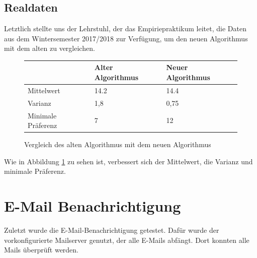 		\subsection{Realdaten}
		
			Letztlich stellte uns der Lehrstuhl, der das Empiriepraktikum leitet, die Daten aus dem Wintersemester 2017/2018 zur Verfügung, um den neuen Algorithmus mit dem alten zu vergleichen.\newline
			
			\begin{figure}
				\centering
				\begin{tabular}{l|l|l}
					& Alter Algorithmus & Neuer Algorithmus \\
					\hline
					Mittelwert & 14.2 & 14.4 \\
					Varianz & 1,8 & 0,75 \\
					Minimale Präferenz & 7 & 12 \\
				\end{tabular}
				\caption{Vergleich des alten Algorithmus mit dem neuen Algorithmus}
				\label{tab:old_versus_new_algorithm}
			\end{figure}
		
			Wie in Abbildung \ref{tab:old_versus_new_algorithm} zu sehen ist, verbessert sich der Mittelwert, die Varianz und minimale Präferenz.
		
	\section{E-Mail Benachrichtigung}
		Zuletzt wurde die E-Mail-Benachrichtigung getestet.
		Dafür wurde der vorkonfigurierte Mailserver genutzt, der alle E-Mails abfängt.
		Dort konnten alle Mails überprüft werden.
		
		
		
		
		
		
		
		
		
		
		
		
		
		
		
		
		
		
		
		
		
		
		
		
		
